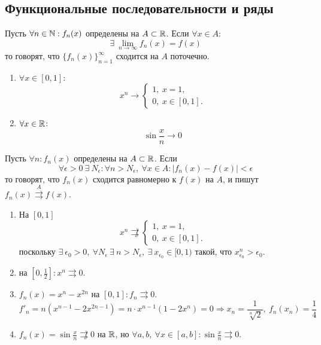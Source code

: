 \subsection{Функциональные последовательности и ряды}
\begin{definition}
    Пусть $\forall n\in \mathbb{N}: f_n(x)$ определены на $A\subset \mathbb{R}$. Если $\forall x\in A$: 
    \[\exists\ \lim\limits_{n\to\infty}f_n(x)=f(x)\]
    то говорят, что $\{f_n(x)\}_{n=1}^{\infty}$ сходится на $A$ поточечно.
\end{definition}
\begin{examples}\tab
    \begin{enumerate}
        \item $\forall x\in[0,1]$:
        \[x^n\to \begin{cases}
            1,\ x=1,\\
            0,\ x\in [0,1].
        \end{cases}\]
        \item $\forall x\in \mathbb{R}$:
        \[\sin{\frac{x}{n}}\to 0\]
    \end{enumerate}
\end{examples}
\begin{definition}
    Пусть $\forall n: f_n(x)$ определены на $A\subset \mathbb{R}$. Если 
    \[\forall \epsilon>0\ \exists\ N_{\epsilon}: \forall n>N_{\epsilon},\ \forall x\in A: |f_n(x)-f(x)|<\epsilon\]
    то говорят, что $f_n(x)$ сходится равномерно к $f(x)$ на $A$, и пишут $f_n(x)\overset{A}\rightrightarrows f(x)$.
\end{definition}
\begin{examples}\tab
    \begin{enumerate}
        \item На $[0,1]$
        \[x^n \not\rightrightarrows \begin{cases}
            1,\ x=1,\\
            0,\ x\in [0,1].
        \end{cases} \]
        поскольку $\exists\ \epsilon_0>0,\ \forall N_{\epsilon}\ \exists\ n>N_{\epsilon},\ \exists\ x_{\epsilon_0}\in [0,1)$ такой, что $x_{\epsilon_0}^n>\epsilon_0$.
        \item на $[0,\frac{1}{2}]: x^n\rightrightarrows 0$.
        \item $f_n(x)=x^n-x^{2n}$ на $[0,1]: f_n\rightrightarrows 0$.
        \[f'_n=n(x^{n-1}-2x^{2n-1})=n\cdot x^{n-1}(1-2x^n)=0 \Rightarrow x_n=\frac{1}{\sqrt[n]{2}},\ f_n(x_n)=\frac{1}{4}\]
        \item $f_n(x)=\sin{\frac{x}{n}} \not\rightrightarrows 0$ на $\mathbb{R}$, но $\forall a,b,\ \forall x\in [a,b]: \sin{\frac{x}{n}}\rightrightarrows 0$.
    \end{enumerate}
\end{examples}
